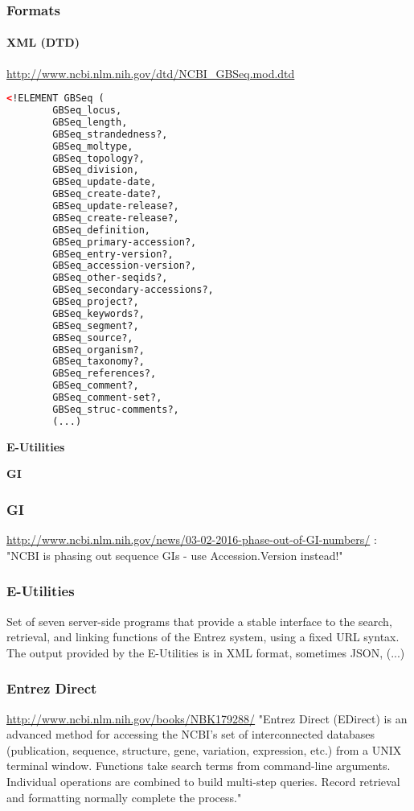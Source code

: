 \documentclass{beamer}
\newcommand{\centeredtitle}[1]{
\begin{center}
    \Huge{\bf{#1}}
\end{center}
}
\newcommand{\hugeslide}[1]{
\begin{frame}
\centeredtitle{#1}
\end{frame}
}
\begin{document}
\begin{frame}[fragile]
\frametitle{Formats}
\framesubtitle{XML (DTD)}
\url{http://www.ncbi.nlm.nih.gov/dtd/NCBI_GBSeq.mod.dtd}
\begin{lstlisting}[language=xml,basicstyle=\tiny,breaklines=false]
<!ELEMENT GBSeq (
        GBSeq_locus, 
        GBSeq_length, 
        GBSeq_strandedness?, 
        GBSeq_moltype, 
        GBSeq_topology?, 
        GBSeq_division, 
        GBSeq_update-date, 
        GBSeq_create-date?, 
        GBSeq_update-release?, 
        GBSeq_create-release?, 
        GBSeq_definition, 
        GBSeq_primary-accession?, 
        GBSeq_entry-version?, 
        GBSeq_accession-version?, 
        GBSeq_other-seqids?, 
        GBSeq_secondary-accessions?, 
        GBSeq_project?, 
        GBSeq_keywords?, 
        GBSeq_segment?, 
        GBSeq_source?, 
        GBSeq_organism?, 
        GBSeq_taxonomy?, 
        GBSeq_references?, 
        GBSeq_comment?, 
        GBSeq_comment-set?, 
        GBSeq_struc-comments?, 
        (...)
\end{lstlisting}
\end{frame}


\hugeslide{E-Utilities}

\hugeslide{GI}


\begin{frame}
\frametitle{GI}
\begin{center}
\url{http://www.ncbi.nlm.nih.gov/news/03-02-2016-phase-out-of-GI-numbers/} : "NCBI is phasing out sequence GIs - use Accession.Version instead!"
\end{center}
\end{frame}

\begin{frame}
\frametitle{E-Utilities}
\begin{center}
Set of seven server-side programs that provide a stable interface to the search, retrieval, and linking functions of the Entrez system, using a fixed URL syntax.\\
The output provided by the E-Utilities is in XML format, sometimes JSON, (...)\\
\end{center}
\end{frame}


\begin{frame}
\frametitle{Entrez Direct}
\begin{center}
\url{http://www.ncbi.nlm.nih.gov/books/NBK179288/}
"Entrez Direct (EDirect) is an advanced method for accessing the NCBI's set of interconnected databases (publication, sequence, structure, gene, variation, expression, etc.) from a UNIX terminal window. Functions take search terms from command-line arguments. Individual operations are combined to build multi-step queries. Record retrieval and formatting normally complete the process."
\end{center}
\end{frame}
\end{document}
